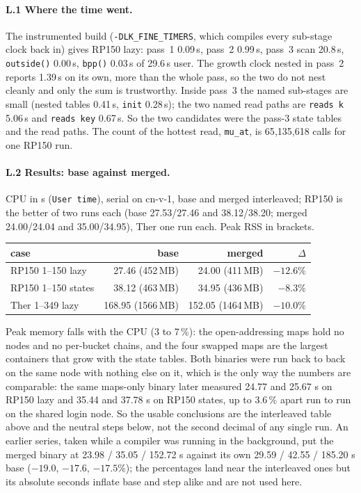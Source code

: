 \documentclass[11pt]{article}
\begin{document}
\paragraph{L.1 Where the time went.} The instrumented build (\texttt{-DLK\_FINE\_TIMERS}, which compiles every sub-stage clock back in) gives RP150 lazy: pass~1 0.09\,s, pass~2 0.99\,s, pass~3 scan 20.8\,s, \texttt{outside()} 0.00\,s, \texttt{bpp()} 0.03\,s of 29.6\,s user. The growth clock nested in pass~2 reports 1.39\,s on its own, more than the whole pass, so the two do not nest cleanly and only the sum is trustworthy. Inside pass~3 the named sub-stages are small (nested tables 0.41\,s, \texttt{init} 0.28\,s); the two named read paths are \texttt{reads k} 5.06\,s and \texttt{reads key} 0.67\,s. So the two candidates were the pass-3 state tables and the read paths. The count of the hottest read, \texttt{mu\_at}, is 65{,}135{,}618 calls for one RP150 run.

\paragraph{L.2 Results: base against merged.} CPU in s (\texttt{User time}), serial on cn-v-1, base and merged interleaved; RP150 is the better of two runs each (base 27.53/27.46 and 38.12/38.20; merged 24.00/24.04 and 35.00/34.95), Ther one run each. Peak RSS in brackets.
\begin{center}
\begin{tabular}{@{}lrrr@{}}
\toprule
case & base & merged & $\Delta$ \\
\midrule
RP150 1--150 lazy & 27.46 (452\,MB) & 24.00 (411\,MB) & $-12.6\%$ \\
RP150 1--150 states & 38.12 (463\,MB) & 34.95 (436\,MB) & $-8.3\%$ \\
Ther 1--349 lazy & 168.95 (1566\,MB) & 152.05 (1464\,MB) & $-10.0\%$ \\
\bottomrule
\end{tabular}
\end{center}
Peak memory falls with the CPU (3 to 7\,\%): the open-addressing maps hold no nodes and no per-bucket chains, and the four swapped maps are the largest containers that grow with the state tables. Both binaries were run back to back on the same node with nothing else on it, which is the only way the numbers are comparable: the same maps-only binary later measured 24.77 and 25.67 s on RP150 lazy and 35.44 and 37.78 s on RP150 states, up to 3.6\,\% apart run to run on the shared login node. So the usable conclusions are the interleaved table above and the neutral steps below, not the second decimal of any single run. An earlier series, taken while a compiler was running in the background, put the merged binary at 23.98 / 35.05 / 152.72 s against its own 29.59 / 42.55 / 185.20 s base ($-19.0$, $-17.6$, $-17.5\%$); the percentages land near the interleaved ones but its absolute seconds inflate base and step alike and are not used here.
\end{document}
